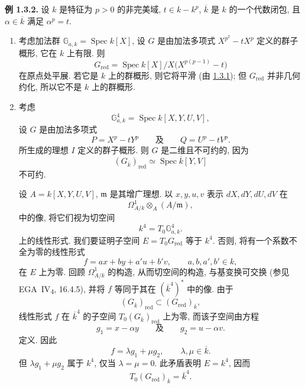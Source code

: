 
\medskip
{}\label{ex:sga3-VIA-1.3.2}%
\noindent\textbf{例 1.3.2.}
设 \(k\) 是特征为 \(p>0\) 的非完美域,
\(t\in k-k^p\), \(\overline k\) 是 \(k\) 的一个代数闭包,
且 \(\alpha\in\overline k\) 满足 \(\alpha^p=t\).

\begin{enumerate}
\item[(1)] 考虑加法群
\(\mathbb G_{a,k}=\operatorname{Spec}k[X]\),
设 \(G\) 是由加法多项式 \(X^{p^2}-tX^p\) 定义的群子概形,
它在 \(k\) 上有限. 则
\[
  G_{\mathrm{red}}
    =\operatorname{Spec}k[X]/X\bigl(X^{p(p-1)}-t\bigr)
\]
在原点处平展. 若它是 \(k\) 上的群概形,
则它将平滑 (由 \hyperref[prop:sga3-VIA-1.3.1]{1.3.1});
但 \(G_{\mathrm{red}}\) 并非几何约化,
所以它不是 \(k\) 上的群概形.

\item[(2)] 考虑
\[
  \mathbb G^4_{a,k}=\operatorname{Spec}k[X,Y,U,V],
\]
设 \(G\) 是由加法多项式
\[
  P=X^p-tY^p
  \qquad\text{及}\qquad
  Q=U^p-tV^p.
\]
所生成的理想 \(I\) 定义的群子概形.
则 \(G\) 是二维且不可约的, 因为
\[
  (G_{\overline k})_{\mathrm{red}}
    \simeq\operatorname{Spec}\overline k[Y,V]
\]
不可约.

设 \(A=k[X,Y,U,V]\), \(\mathfrak m\) 是其增广理想.
以 \(x,y,u,v\) 表示 \(dX,dY,dU,dV\) 在
\[
  \Omega^1_{A/k}\otimes_A(A/\mathfrak m),
\]
中的像, 将它们视为切空间
\[
  k^4=T_0\mathbb G^4_{a,k}.
\]
上的线性形式.
我们要证明子空间 \(E=T_0G_{\mathrm{red}}\) 等于 \(k^4\).
否则, 将有一个系数不全为零的线性形式
\[
  f=ax+by+a'u+b'v,
  \qquad a,b,a',b'\in k,
\]
在 \(E\) 上为零.
回顾 \(\Omega^1_{A/k}\) 的构造, 从而切空间的构造,
与基变换可交换 (参见 EGA~IV\textsubscript{4}, 16.4.5),
并将 \(f\) 等同于其在 \((\overline k^4)^*\) 中的像.
由于
\[
  (G_{\overline k})_{\mathrm{red}}
    \subset (G_{\mathrm{red}})_{\overline k},
\]
线性形式 \(f\) 在 \(\overline k^4\) 的子空间
\(T_0(G_{\overline k})_{\mathrm{red}}\) 上为零,
而该子空间由方程
\[
  g_1=x-\alpha y
  \qquad\text{及}\qquad
  g_2=u-\alpha v.
\]
定义. 因此
\[
  f=\lambda g_1+\mu g_2,
  \qquad \lambda,\mu\in\overline k.
\]
但 \(\lambda g_1+\mu g_2\) 属于 \(k^4\),
仅当 \(\lambda=\mu=0\).
此矛盾表明 \(E=k^4\), 因而
\[
  T_0(G_{\mathrm{red}})_{\overline k}=\overline k^4.
\]


\end{enumerate}
